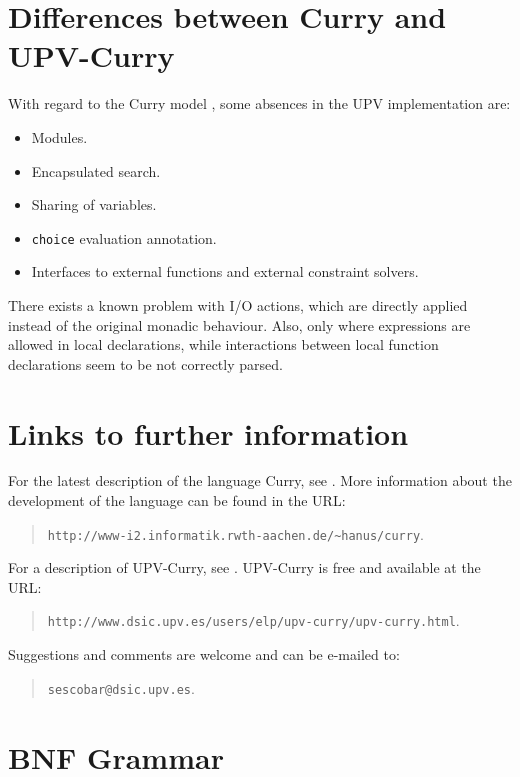 \documentclass[titlepage,fleqn]{article}
\newcommand{\pr}[1]{\mbox{\tt #1}}   %
\begin{document}
\section{Differences between Curry and UPV-Curry}\label{differences}

With regard to the Curry model \cite{Hanus98Curry}, 
some absences in the UPV implementation are:
\begin{itemize}
\item Modules.
\item Encapsulated search.
\item Sharing of variables.
\item \pr{choice} evaluation annotation.
\item Interfaces to external functions and external constraint solvers.
\end{itemize}

There exists a known problem with I/O actions,
which are directly applied instead of the original monadic behaviour.
Also, only where expressions are allowed in local declarations, while 
interactions between local function declarations seem to be
not correctly parsed.

\section{Links to further information}\label{links}

\noindent
For the latest description of the language Curry, 
see \cite{Hanus98Curry}.
More information about the development of the language can be found
in the URL:
\begin{quote}
\verb_http://www-i2.informatik.rwth-aachen.de/~hanus/curry_.
\end{quote}

\noindent
For a description of UPV-Curry, see \cite{AEL99}.
UPV-Curry is free and available at the URL:
\begin{quote}
\verb_http://www.dsic.upv.es/users/elp/upv-curry/upv-curry.html_.
\end{quote}

\noindent
Suggestions and comments are welcome and can be e-mailed to:
\begin{quote}
\verb_sescobar@dsic.upv.es_.
\end{quote}

\appendix

\section{BNF Grammar}\label{grammar}
\end{document}
